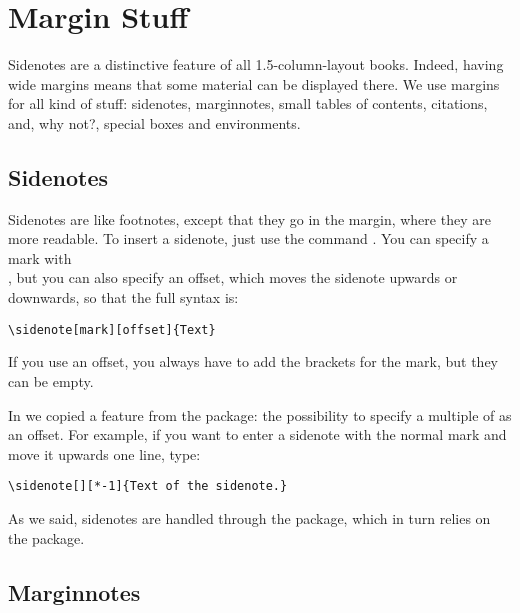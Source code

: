 \setchapterpreamble[u]{\margintoc}
\chapter{Margin Stuff}

Sidenotes are a distinctive feature of all 1.5-column-layout books. 
Indeed, having wide margins means that some material can be displayed 
there. We use margins for all kind of stuff: sidenotes, marginnotes, 
small tables of contents, citations, and, why not?, special boxes and 
environments.

\section{Sidenotes}

Sidenotes are like footnotes, except that they go in the margin, where 
they are more readable. To insert a sidenote, just use the command 
. You can specify a 
mark with \\ 
, but you can also specify an offset, 
which moves the sidenote upwards or downwards, so that the full syntax is:

\begin{lstlisting}[style=kaolstplain]
\sidenote[mark][offset]{Text}
\end{lstlisting}

If you use an offset, you always have to add the brackets for the mark, 
but they can be empty.

In  we copied a feature from the  
package: the possibility to specify a multiple of  
as an offset. For example, if you want to enter a sidenote with the 
normal mark and move it upwards one line, type:

\begin{lstlisting}[style=kaolstplain]
\sidenote[][*-1]{Text of the sidenote.}
\end{lstlisting}

As we said, sidenotes are handled through the  
package, which in turn relies on the  package.

\section{Marginnotes}

